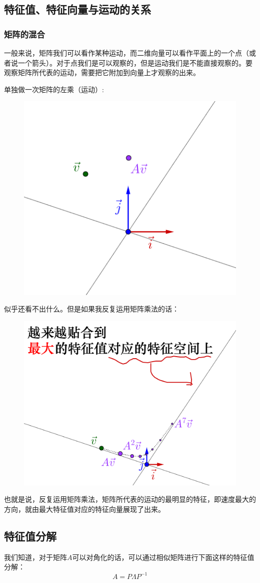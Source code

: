 \documentclass[12pt]{article}
\begin{document}
\subsection{特征值、特征向量与运动的关系}
\subsubsection{矩阵的混合}
一般来说，矩阵我们可以看作某种运动，而二维向量可以看作平面上的一个点（或者说一个箭头）。对于点我们是可以观察的，但是运动我们是不能直接观察的。要观察矩阵所代表的运动，需要把它附加到向量上才观察的出来。

单独做一次矩阵的左乘（运动）:
\begin{figure}[H]
    \centering
    \includegraphics[width=.5\textwidth]{fig/UnderstandEigenValueVector_7.png}
\end{figure} 

似乎还看不出什么。但是如果我反复运用矩阵乘法的话：
\begin{figure}[H]
    \centering
    \includegraphics[width=.5\textwidth]{fig/UnderstandEigenValueVector_8.png}
\end{figure} 

也就是说，反复运用矩阵乘法，矩阵所代表的运动的最明显的特征，即速度最大的方向，就由最大特征值对应的特征向量展现了出来。

\subsection{特征值分解}
我们知道，对于矩阵$A$可以对角化的话，可以通过相似矩阵进行下面这样的特征值分解：
$$
A = P\Lambda P^{-1}
$$
\end{document}
